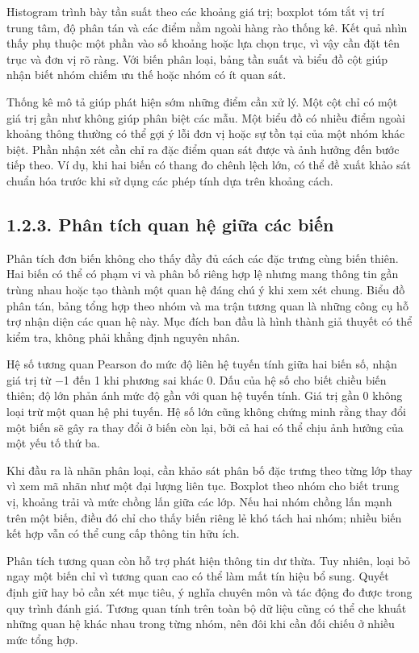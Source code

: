Histogram trình bày tần suất theo các khoảng giá trị; boxplot tóm tắt vị trí trung tâm, độ phân tán và các điểm nằm ngoài hàng rào thống kê. Kết quả nhìn thấy phụ thuộc một phần vào số khoảng hoặc lựa chọn trục, vì vậy cần đặt tên trục và đơn vị rõ ràng. Với biến phân loại, bảng tần suất và biểu đồ cột giúp nhận biết nhóm chiếm ưu thế hoặc nhóm có ít quan sát.


Thống kê mô tả giúp phát hiện sớm những điểm cần xử lý. Một cột chỉ có một giá trị gần như không giúp phân biệt các mẫu. Một biểu đồ có nhiều điểm ngoài khoảng thông thường có thể gợi ý lỗi đơn vị hoặc sự tồn tại của một nhóm khác biệt. Phần nhận xét cần chỉ ra đặc điểm quan sát được và ảnh hưởng đến bước tiếp theo. Ví dụ, khi hai biến có thang đo chênh lệch lớn, có thể đề xuất khảo sát chuẩn hóa trước khi sử dụng các phép tính dựa trên khoảng cách.


\subsection{1.2.3. Phân tích quan hệ giữa các biến}

Phân tích đơn biến không cho thấy đầy đủ cách các đặc trưng cùng biến thiên. Hai biến có thể có phạm vi và phân bố riêng hợp lệ nhưng mang thông tin gần trùng nhau hoặc tạo thành một quan hệ đáng chú ý khi xem xét chung. Biểu đồ phân tán, bảng tổng hợp theo nhóm và ma trận tương quan là những công cụ hỗ trợ nhận diện các quan hệ này. Mục đích ban đầu là hình thành giả thuyết có thể kiểm tra, không phải khẳng định nguyên nhân.


Hệ số tương quan Pearson đo mức độ liên hệ tuyến tính giữa hai biến số, nhận giá trị từ \ensuremath{-}1 đến 1 khi phương sai khác 0. Dấu của hệ số cho biết chiều biến thiên; độ lớn phản ánh mức độ gần với quan hệ tuyến tính. Giá trị gần 0 không loại trừ một quan hệ phi tuyến. Hệ số lớn cũng không chứng minh rằng thay đổi một biến sẽ gây ra thay đổi ở biến còn lại, bởi cả hai có thể chịu ảnh hưởng của một yếu tố thứ ba.


Khi đầu ra là nhãn phân loại, cần khảo sát phân bố đặc trưng theo từng lớp thay vì xem mã nhãn như một đại lượng liên tục. Boxplot theo nhóm cho biết trung vị, khoảng trải và mức chồng lấn giữa các lớp. Nếu hai nhóm chồng lấn mạnh trên một biến, điều đó chỉ cho thấy biến riêng lẻ khó tách hai nhóm; nhiều biến kết hợp vẫn có thể cung cấp thông tin hữu ích.


Phân tích tương quan còn hỗ trợ phát hiện thông tin dư thừa. Tuy nhiên, loại bỏ ngay một biến chỉ vì tương quan cao có thể làm mất tín hiệu bổ sung. Quyết định giữ hay bỏ cần xét mục tiêu, ý nghĩa chuyên môn và tác động đo được trong quy trình đánh giá. Tương quan tính trên toàn bộ dữ liệu cũng có thể che khuất những quan hệ khác nhau trong từng nhóm, nên đôi khi cần đối chiếu ở nhiều mức tổng hợp.


